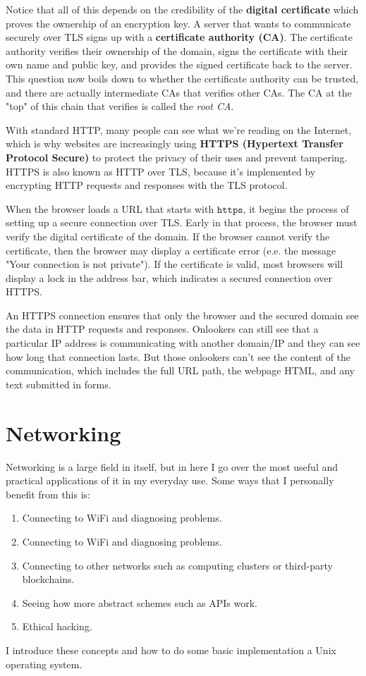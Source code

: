 \documentclass{article}
\newcounter{question}[section]
\begin{document}
  Notice that all of this depends on the credibility of the \textbf{digital certificate} which proves the ownership of an encryption key. A server that wants to communicate securely over TLS signs up with a \textbf{certificate authority (CA)}. The certificate authority verifies their ownership of the domain, signs the certificate with their own name and public key, and provides the signed certificate back to the server. This question now boils down to whether the certificate authority can be trusted, and there are actually intermediate CAs that verifies other CAs. The CA at the "top" of this chain that verifies is called the \textit{root CA}. 

  With standard HTTP, many people can see what we're reading on the Internet, which is why websites are increasingly using \textbf{HTTPS (Hypertext Transfer Protocol Secure)} to protect the privacy of their uses and prevent tampering. HTTPS is also known as HTTP over TLS, because it's implemented by encrypting HTTP requests and responses with the TLS protocol. 

  When the browser loads a URL that starts with $\texttt{https}$, it begins the process of setting up a secure connection over TLS. Early in that process, the browser must verify the digital certificate of the domain. If the browser cannot verify the certificate, then the browser may display a certificate error (e.e. the message "Your connection is not private"). If the certificate is valid, most browsers will display a lock in the address bar, which indicates a secured connection over HTTPS. 

  An HTTPS connection ensures that only the browser and the secured domain see the data in HTTP requests and responses. Onlookers can still see that a particular IP address is communicating with another domain/IP and they can see how long that connection lasts. But those onlookers can't see the content of the communication, which includes the full URL path, the webpage HTML, and any text submitted in forms. 

\section{Networking} 

  Networking is a large field in itself, but in here I go over the most useful and practical applications of it in my everyday use. Some ways that I personally benefit from this is:

  \begin{enumerate}
    \item Connecting to WiFi and diagnosing problems.  
    \item Connecting to WiFi and diagnosing problems. 
    \item Connecting to other networks such as computing clusters or third-party blockchains.  
    \item Seeing how more abstract schemes such as APIs work. 
    \item Ethical hacking. 
  \end{enumerate}
  I introduce these concepts and how to do some basic implementation a Unix operating system.
\end{document}

